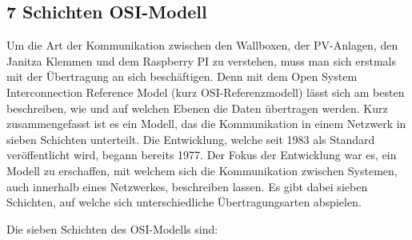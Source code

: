 \label{ModbusErklärung}

\subsection{7 Schichten OSI-Modell} \label{OsiModell}

Um die Art der Kommunikation zwischen den Wallboxen, der PV-Anlagen, den Janitza Klemmen und dem Raspberry PI zu verstehen, muss man sich erstmals mit der Übertragung an sich beschäftigen. Denn mit dem Open System Interconnection Reference Model (kurz OSI-Referenzmodell) lässt sich am besten beschreiben, wie und auf welchen Ebenen die Daten übertragen werden.  Kurz zusammengefasst ist es ein Modell, das die Kommunikation in einem Netzwerk in sieben Schichten unterteilt. Die Entwicklung, welche seit 1983 als Standard veröffentlicht wird, begann bereits 1977.  Der Fokus der Entwicklung war es, ein Modell zu erschaffen, mit welchem sich die Kommunikation zwischen Systemen, auch innerhalb eines Netzwerkes, beschreiben lassen. Es gibt dabei sieben Schichten, auf welche sich unterschiedliche Übertragungsarten abspielen. 

Die sieben Schichten des OSI-Modells sind:  


